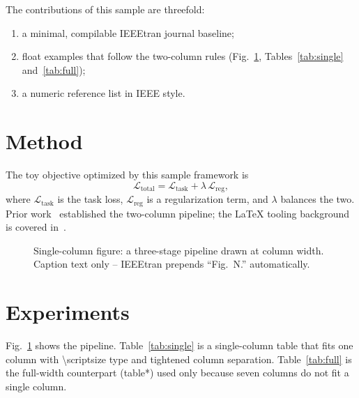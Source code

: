 \documentclass[journal,10pt]{IEEEtran}
\begin{document}
The contributions of this sample are threefold:
\begin{enumerate}
  \item a minimal, compilable IEEEtran journal baseline;
  \item float examples that follow the two-column rules
        (Fig.~\ref{fig:overview}, Tables~\ref{tab:single} and~\ref{tab:full});
  \item a numeric reference list in IEEE style.
\end{enumerate}

\section{Method}
The toy objective optimized by this sample framework is
\begin{equation}
  \mathcal{L}_{\text{total}} = \mathcal{L}_{\text{task}}
  + \lambda\,\mathcal{L}_{\text{reg}},
  \label{eq:loss}
\end{equation}
where $\mathcal{L}_{\text{task}}$ is the task loss,
$\mathcal{L}_{\text{reg}}$ is a regularization term, and $\lambda$ balances
the two. Prior work~\cite{doe2024,roe2023} established the two-column
pipeline; the LaTeX tooling background is covered
in~\cite{mittelbach2004,carlisle2019}.

\begin{figure}[!t]
  \centering
  \caption{Single-column figure: a three-stage pipeline drawn at column
  width. Caption text only -- IEEEtran prepends ``Fig.~N.'' automatically.}
  \label{fig:overview}
\end{figure}

\section{Experiments}
Fig.~\ref{fig:overview} shows the pipeline. Table~\ref{tab:single} is a
single-column table that fits one column with \textbackslash scriptsize
type and tightened column separation. Table~\ref{tab:full} is the
full-width counterpart (table*) used only because seven columns do not fit
a single column.
\end{document}
